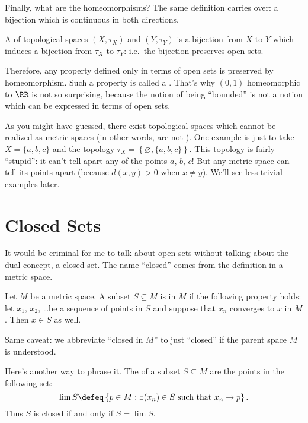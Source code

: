 
Finally, what are the homeomorphisms?
The same definition carries over: a bijection which is continuous in both directions.
\begin{definition}
	A  of topological spaces $(X, \tau_X)$ and $(Y, \tau_Y)$
	is a bijection from $X$ to $Y$
	which induces a bijection from $\tau_X$ to $\tau_Y$:
	i.e.\ the bijection preserves open sets.
\end{definition}
Therefore, any property defined only in terms of open sets is preserved by homeomorphism.
Such a property is called a .
That's why $(0,1)$ homeomorphic to $\RR$ is not so surprising,
because the notion of being ``bounded'' is not a notion
which can be expressed in terms of open sets.

\begin{remark}
	As you might have guessed, there exist topological spaces which cannot be realized
	as metric spaces (in other words, are not ).
	One example is just to take $X = \{a,b,c\}$ and the topology $\tau_X = \left\{ \varnothing, \{a,b,c\} \right\}$.
	This topology is fairly ``stupid'': it can't tell apart any of the points $a$, $b$, $c$!
	But any metric space can tell its points apart (because $d(x,y) > 0$ when $x \neq y$).
	We'll see less trivial examples later.
\end{remark}


\section{Closed Sets}
It would be criminal for me to talk about open sets without talking about the dual concept, a closed set.
The name ``closed'' comes from the definition in a metric space.
\begin{definition}
	Let $M$ be a metric space.
	A subset $S \subseteq M$ is  in $M$ if the following property holds:
	let $x_1$, $x_2$, \dots be a sequence of points in $S$
	and suppose that $x_n$ converges to $x$ in $M$.
	Then $x \in S$ as well.
\end{definition}
\begin{abuse}
	Same caveat: we abbreviate ``closed in $M$'' to just ``closed''
	if the parent space $M$ is understood.
\end{abuse}
Here's another way to phrase it.
The  of a subset $S \subseteq M$ are the points
in the following set:
\[ \lim S \defeq \left\{ p \in M : \exists (x_n) \in S \text{ such that } x_n \to p \right\}. \]
Thus $S$ is closed if and only if $S = \lim S$.

